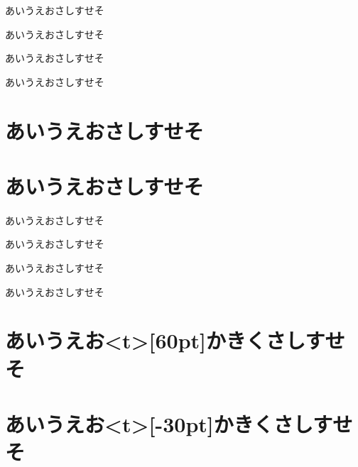 \documentclass{jarticle}
\begin{document}

あいうえおさしすせそ\par
あいうえおさしすせそ\par

あいうえおさしすせそ\par
あいうえおさしすせそ\par

\section{あいうえおさしすせそ}
\section{あいうえおさしすせそ}

あいうえおさしすせそ\par
あいうえおさしすせそ\par %

あいうえおさしすせそ\par
あいうえおさしすせそ\par %

\section{あいうえお\pbox<t>[60pt]{かきく}さしすせそ}
\section{あいうえお\pbox<t>[-30pt]{かきく}さしすせそ}
\end{document}
